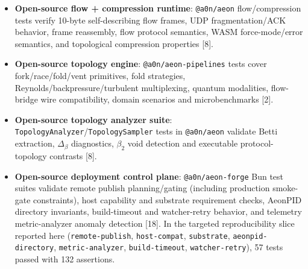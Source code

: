 \documentclass[
  11pt,
]{article}
\begin{document}
\begin{itemize}
  and invalid-corpus rejections). The parser result is therefore speed
  plus capability surface: unlike the parser-only baseline,
  \texttt{aeon-logic} also exposes superposition chains, quorum temporal
  operators, topology bridges, Lean-sandbox project/build verification,
  and embedded model-checker interfaces in the same runtime {[}13,
  14{]}. Mechanized TLA+ model checking across the current formal module
  set (C1--C4, queueing sample-path conservation, bounded multi-class
  queueing-network conservation, finite-support stochastic
  queueing-mixture conservation, exact finite-state probabilistic queue
  and multiclass-network kernels, larger exact finite-support
  queueing-network cubes, §13 formulas, cross-shard crossover,
  scheduler-overhead bounds, quorum visibility, connected-quorum
  exactness, committed-session consistency, multi-writer committed-read
  ordering, committed-state history refinement, protocol/settlement
  deficits, quantum deficit identity, band-gap void, beauty-optimality
  scaffold), and a Lean 4 theorem package with constructive identities,
  bounded protocol refinements for
  visibility/connectivity/consistency/ordering/history-refinement,
  infinite-support, countably supported stochastic, measure-theoretic,
  stable \texttt{M/M/1}, and Cesaro queueing lifts, plus
  explicit-assumption theorem schemas (including the stronger
  correspondence-boundary property-negation and general nonadditive-fold
  impossibility theorem plus the global convergence schema) verify the
  strongest operational claims section by section {[}9, 12, 13, 14{]}.
\item
  \textbf{Open-source flow + compression runtime}:
  \texttt{@a0n/aeon} flow/compression tests verify 10-byte
  self-describing flow frames, UDP fragmentation/ACK behavior, frame
  reassembly, flow protocol semantics, WASM force-mode/error semantics,
  and topological compression properties {[}8{]}.
\item
  \textbf{Open-source topology engine}:
  \texttt{@a0n/aeon-pipelines} tests cover fork/race/fold/vent
  primitives, fold strategies, Reynolds/backpressure/turbulent
  multiplexing, quantum modalities, flow-bridge wire compatibility,
  domain scenarios and microbenchmarks {[}2{]}.
\item
  \textbf{Open-source topology analyzer suite}:
  \texttt{TopologyAnalyzer}/\texttt{TopologySampler} tests in
  \texttt{@a0n/aeon} validate Betti extraction, \(\Delta_\beta\)
  diagnostics, \(\beta_2\) void detection and executable
  protocol-topology contrasts {[}8{]}.
\item
  \textbf{Open-source deployment control plane}:
  \texttt{@a0n/aeon-forge} Bun test suites validate remote
  publish planning/gating (including production smoke-gate constraints),
  host capability and substrate requirement checks, AeonPID directory
  invariants, build-timeout and watcher-retry behavior, and telemetry
  metric-analyzer anomaly detection {[}18{]}. In the targeted
  reproducibility slice reported here (\texttt{remote-publish},
  \texttt{host-compat}, \texttt{substrate}, \texttt{aeonpid-directory},
  \texttt{metric-analyzer}, \texttt{build-timeout},
  \texttt{watcher-retry}), 57 tests passed with 132 assertions.
\end{itemize}
\end{document}
